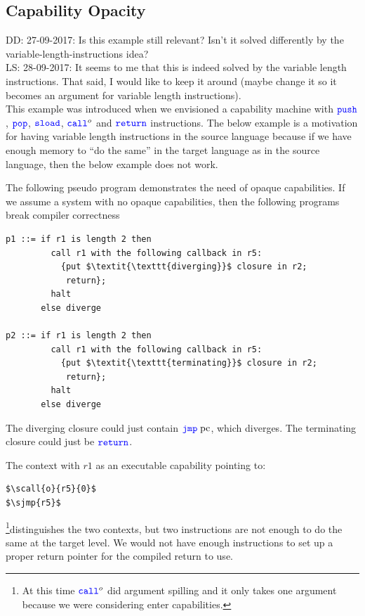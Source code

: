 \documentclass[a3paper]{article}
\newcommand\lau[1]{{\color{purple} \sf \footnotesize {LS: #1}}\\}
\newcommand\dominique[1]{{\color{purple} \sf \footnotesize {DD: #1}}\\}
\newcommand{\sourcecolor}{\color{blue}}
\newcommand{\src}[1]{{\sourcecolor #1}}
\newcommand{\zinstr}[1]{\texttt{#1}}
\newcommand{\oneinstr}[2]{
  \ifthenelse{\equal{#2}{}}
  {\zinstr{#1}}
  {\zinstr{#1} \; #2}
}
\newcommand{\twoinstr}[3]{
  \ifthenelse{\equal{#2#3}{}}
  {\zinstr{#1}}
  {\zinstr{#1} \; #2 \; #3}
}
\newcommand{\sreturn}{\zinstr{\src{return}}}
\newcommand{\sjmp}[1]{\oneinstr{\src{jmp}}{#1}}
\newcommand{\spush}[1]{\oneinstr{\src{push}}{#1}}
\newcommand{\spop}[1]{\oneinstr{\src{pop}}{#1}}
\newcommand{\ssload}[2]{\twoinstr{\src{sload}}{#1}{#2}}
\newcommand{\scall}[4][]{  
\ifthenelse{\equal{#3#4}{}}
  {\ensuremath{\zinstr{\src{call}}_{#1}^{#2}}}
  {\ensuremath{\zinstr{\src{call}}_{#1}^{#2} \; #3 \; #4}}
}
\newcommand{\pcreg}{\mathrm{pc}}
\begin{document}
\subsection{Capability Opacity}
\label{subsec:capability-opacity}

\dominique{27-09-2017: Is this example still relevant? Isn't it solved differently by the variable-length-instructions idea?}
\lau{28-09-2017: It seems to me that this is indeed solved by the variable length instructions. That said, I would like to keep it around (maybe change it so it becomes an argument for variable length instructions).}
This example was introduced when we envisioned a capability machine with $\spush{}$, $\spop{}$, $\ssload{}{}$, $\scall{o}{}{}$ and $\sreturn$ instructions. The below example is a motivation for having variable length instructions in the source language because if we have enough memory to ``do the same'' in the target language as in the source language, then the below example does not work.

The following pseudo program demonstrates the need of opaque capabilities. If we assume a system with no opaque capabilities, then the following programs break compiler correctness
\begin{lstlisting}[basicstyle=\sourcecolor{}\ttfamily] 
p1 ::= if r1 is length 2 then
         call r1 with the following callback in r5:
           {put $\textit{\texttt{diverging}}$ closure in r2;
            return};
         halt
       else diverge

p2 ::= if r1 is length 2 then
         call r1 with the following callback in r5:
           {put $\textit{\texttt{terminating}}$ closure in r2;
            return};
         halt
       else diverge
\end{lstlisting}
The diverging closure could just contain $\sjmp{\pcreg}$, which diverges. The terminating closure could just be $\sreturn$.

The context with $r1$ as an executable capability pointing to:
\begin{lstlisting}[basicstyle=\sourcecolor{}\ttfamily] 
$\scall{o}{r5}{0}$
$\sjmp{r5}$
\end{lstlisting}
\footnote{At this time $\scall{o}{}{}$ did argument spilling and it only takes one argument because we were considering enter capabilities.}distinguishes the two contexts, but two instructions are not enough to do the same at the target level. We would not have enough instructions to set up a proper return pointer for the compiled return to use.
\end{document}
